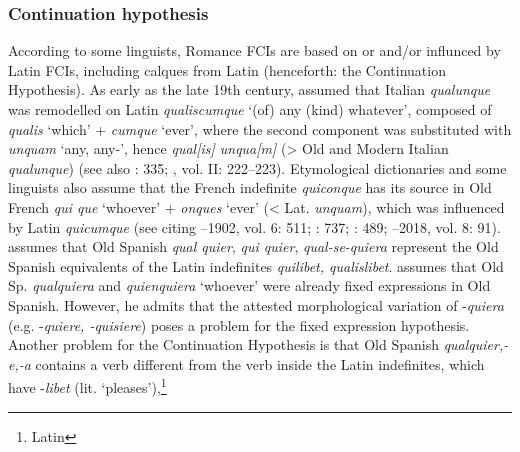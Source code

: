 \subsubsection{{Continuation hypothesis}} \label{sec:2.6.1.1}

According to some linguists, Romance FCIs are based on or and/or influnced by Latin FCIs, including calques from Latin (henceforth: the Continuation Hypothesis). As early as the late 19th century, \citet[57]{Meyerlubke1899} assumed that Italian \textit{qualunque} was remodelled on Latin \textit{qualiscumque} ‘(of) any (kind) whatever’, composed of \textit{qualis} ‘which’ + \textit{cumque} ‘ever’, where the second component was substituted with \textit{unquam} ‘any, any-’, hence \textit{qual[is] unqua[m]} (> Old and Modern Italian \textit{qualunque}) (see also \citealt{CortelazzoZolli1979}: 335; \citealt{Rohlfs1966-1968}, vol. II: 222–223). Etymological dictionaries and some linguists also assume that the French indefinite \textit{quiconque} has its source in Old French \textit{qui que} ‘whoever’ + \textit{onques} ‘ever’ (< Lat. \textit{unquam}), which was influenced by Latin \textit{quicumque} (see \citealt{Becker2014} citing \citealt{Godefroy2006}–1902, vol. 6: 511; \citealt{Gamillscheg1969}: 737; \citealt{Greimas1998}: 489; \citealt{Tobler1925-2002}–2018, vol. 8: 91). \citet{Menendezpidal1928} assumes that Old Spanish \textit{qual quier}, \textit{qui quier}, \textit{qual-se-quiera} represent the Old Spanish equivalents of the Latin indefinites \textit{quilibet, qualislibet}. \citet[387f.]{Meier1950} assumes that Old Sp. \textit{qualquiera} and \textit{quienquiera} ‘whoever’ were already fixed expressions in Old Spanish. However, he admits that the attested morphological variation of -\textit{quiera} (e.g. -\textit{quiere, -quisiere}) poses a problem for the fixed expression hypothesis. Another problem for the Continuation Hypothesis is that Old Spanish \textit{qualquier,-e,-a} contains a verb different from the verb inside the Latin indefinites, which have -\textit{libet} (lit. ‘pleases’),\footnote{{Latin
}}
